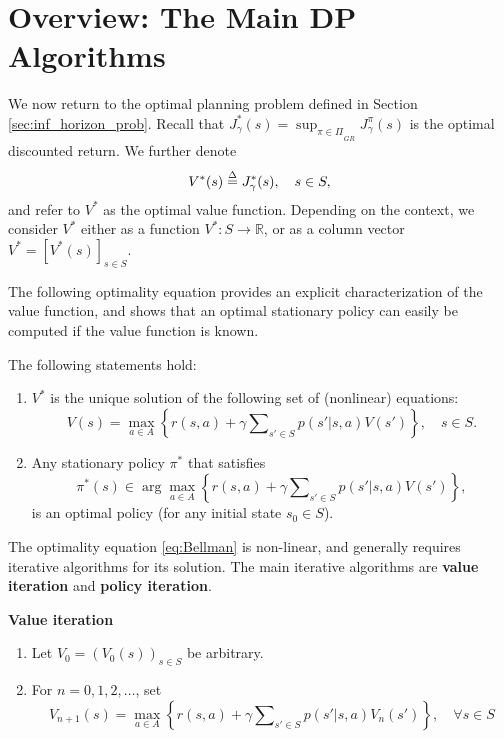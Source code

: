 \section{Overview: The Main DP Algorithms}

We now return to the optimal planning problem defined in Section \ref{sec:inf_horizon_prob}. Recall that  $J_\gamma ^*(s) = {\sup _{\pi  \in \Pi }}_{_{GR}}J_\gamma ^\pi (s)$ is the optimal discounted return. We further denote
\[{V^*}(s) \buildrel \Delta \over = J_\gamma ^*(s),    \quad s \in S,\]
and refer to ${V^*}$ as the optimal value function. Depending on the context, we consider ${V^*}$ either as a function $V^* : S \to \mathbb R$, or as a column vector ${V^*} = {[V^*(s)]_{s \in S}}$.

The following optimality equation provides an explicit characterization of the value function, and shows that an optimal stationary policy can easily be computed if the value function is known.

\begin{theorem}\label{thm:inf_Bellman} The following statements hold:
\begin{enumerate}
  \item $V_{}^*$ is the unique solution of the following set of (nonlinear) equations:
\begin{equation}\label{eq:Bellman}
V(s) = \mathop {\max }\limits_{a \in A} \left\{ {r(s,a) + \gamma \sum\nolimits_{s' \in S} {p(s'|s,a)V(s')} } \right\},     \quad s \in S.
\end{equation}
  \item Any stationary policy ${\pi ^*}$ that satisfies
\[{\pi ^*}(s) \in \arg {\max _{a \in A}}\left\{ {r(s,a) + \gamma \sum\nolimits_{s' \in S} {p(s'|s,a)V(s')} } \right\},\]
     is an optimal policy (for any initial state ${s_0} \in S$).
\end{enumerate}
\end{theorem}
The optimality equation \eqref{eq:Bellman} is non-linear, and generally requires iterative algorithms for its solution. The main iterative algorithms are \textbf{value iteration} and \textbf{policy iteration}.

\begin{algorithm_}\textbf{Value iteration}\label{alg:VI}
\begin{enumerate}
  \item Let ${V_0} = {({V_0}(s))_{s \in S}}$ be arbitrary.
  \item For $n = 0,1,2, \ldots $, set
\[{V_{n + 1}}(s) = \mathop {\max }\limits_{a \in A} \left\{ {r(s,a) + \gamma \sum\nolimits_{s' \in S} {p(s'|s,a){V_n}(s')} } \right\},    \quad \forall s \in S\]
\end{enumerate}
\end{algorithm_}

